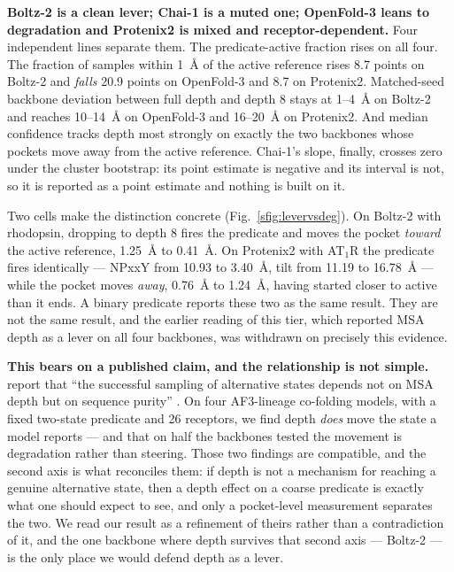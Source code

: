 \textbf{Boltz-2 is a clean lever; Chai-1 is a muted one; OpenFold-3 leans to
degradation and Protenix2 is mixed and receptor-dependent.} Four independent
lines separate them. The predicate-active fraction rises on all four. The
fraction of samples within 1~\AA{} of the active reference rises 8.7 points on
Boltz-2 and \emph{falls} 20.9 points on OpenFold-3 and 8.7 on Protenix2.
Matched-seed backbone deviation between full depth and depth 8 stays at
1--4~\AA{} on Boltz-2 and reaches 10--14~\AA{} on OpenFold-3 and 16--20~\AA{} on
Protenix2. And median confidence tracks depth most strongly on exactly the two
backbones whose pockets move away from the active reference. Chai-1's slope,
finally, crosses zero under the cluster bootstrap: its point estimate is
negative and its interval is not, so it is reported as a point estimate and
nothing is built on it.

Two cells make the distinction concrete (Fig.~\ref{sfig:levervsdeg}). On
Boltz-2 with rhodopsin, dropping to depth 8 fires the predicate and moves the
pocket \emph{toward} the active reference, 1.25~\AA{} to 0.41~\AA{}. On
Protenix2 with AT$_1$R the predicate fires identically --- NPxxY from 10.93 to
3.40~\AA{}, tilt from 11.19 to 16.78~\AA{} --- while the pocket moves
\emph{away}, 0.76~\AA{} to 1.24~\AA{}, having started closer to active than it
ends. A binary predicate reports these two as the same result. They are not the
same result, and the earlier reading of this tier, which reported MSA depth as a
lever on all four backbones, was withdrawn on precisely this evidence.

\textbf{This bears on a published claim, and the relationship is not simple.}
\citet{xing2025purified} report that ``the successful sampling of alternative
states depends not on MSA depth but on sequence purity'' \citep[p.~3]{xing2025purified}.
On four AF3-lineage co-folding models, with a fixed two-state predicate and 26
receptors, we find depth \emph{does} move the state a model reports --- and that
on half the backbones tested the movement is degradation rather than steering.
Those two findings are compatible, and the second axis is what reconciles them:
if depth is not a mechanism for reaching a genuine alternative state, then a
depth effect on a coarse predicate is exactly what one should expect to see, and
only a pocket-level measurement separates the two. We read our result as a
refinement of theirs rather than a contradiction of it, and the one backbone
where depth survives that second axis --- Boltz-2 --- is the only place we would
defend depth as a lever.

